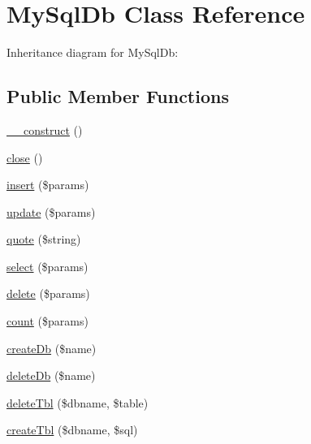 \hypertarget{class_zest_1_1_database_1_1_drives_1_1_m_y_s_q_l_1_1_my_sql_db}{}\section{My\+Sql\+Db Class Reference}
\label{class_zest_1_1_database_1_1_drives_1_1_m_y_s_q_l_1_1_my_sql_db}


Inheritance diagram for My\+Sql\+Db\+:
\subsection*{Public Member Functions}
\begin{DoxyCompactItemize}
\item 
\mbox{\hyperlink{class_zest_1_1_database_1_1_drives_1_1_m_y_s_q_l_1_1_my_sql_db_a095c5d389db211932136b53f25f39685}{\+\_\+\+\_\+construct}} ()
\item 
\mbox{\hyperlink{class_zest_1_1_database_1_1_drives_1_1_m_y_s_q_l_1_1_my_sql_db_aa69c8bf1f1dcf4e72552efff1fe3e87e}{close}} ()
\item 
\mbox{\hyperlink{class_zest_1_1_database_1_1_drives_1_1_m_y_s_q_l_1_1_my_sql_db_a67366620fdfeaab4b480b6e4dca64deb}{insert}} (\$params)
\item 
\mbox{\hyperlink{class_zest_1_1_database_1_1_drives_1_1_m_y_s_q_l_1_1_my_sql_db_aacfc8ca52b10f139be3398f374cd01cb}{update}} (\$params)
\item 
\mbox{\hyperlink{class_zest_1_1_database_1_1_drives_1_1_m_y_s_q_l_1_1_my_sql_db_ab0de61372611c058fe76c1a341691182}{quote}} (\$string)
\item 
\mbox{\hyperlink{class_zest_1_1_database_1_1_drives_1_1_m_y_s_q_l_1_1_my_sql_db_aaade19290861bb3abf902bb14a51889b}{select}} (\$params)
\item 
\mbox{\hyperlink{class_zest_1_1_database_1_1_drives_1_1_m_y_s_q_l_1_1_my_sql_db_a2fb5b35138aabdbcdbabde07ff1df4b6}{delete}} (\$params)
\item 
\mbox{\hyperlink{class_zest_1_1_database_1_1_drives_1_1_m_y_s_q_l_1_1_my_sql_db_a47d80aeef2e59da428db2507a28a34ac}{count}} (\$params)
\item 
\mbox{\hyperlink{class_zest_1_1_database_1_1_drives_1_1_m_y_s_q_l_1_1_my_sql_db_a3653b70be0271cad4b87a49bdcd18ccf}{create\+Db}} (\$name)
\item 
\mbox{\hyperlink{class_zest_1_1_database_1_1_drives_1_1_m_y_s_q_l_1_1_my_sql_db_ae35a90b0a5f1b3d17dfbe5323b6d6983}{delete\+Db}} (\$name)
\item 
\mbox{\hyperlink{class_zest_1_1_database_1_1_drives_1_1_m_y_s_q_l_1_1_my_sql_db_ad88421fa08d580a9e949a08dad8e3cdb}{delete\+Tbl}} (\$dbname, \$table)
\item 
\mbox{\hyperlink{class_zest_1_1_database_1_1_drives_1_1_m_y_s_q_l_1_1_my_sql_db_a9d04c1a2e54f2c278564f0ac294f42ab}{create\+Tbl}} (\$dbname, \$sql)
\end{DoxyCompactItemize}


